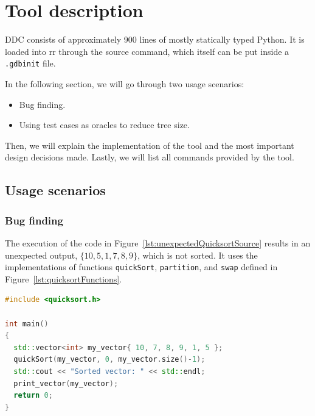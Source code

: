 \chapter{Tool description}
\label{cap:toolDescription}
DDC consists of approximately 900 lines of mostly statically typed Python.
%
It is loaded into rr through the source command, which itself can be put inside a \verb|.gdbinit| file.

In the following section, we will go through two usage scenarios:
\begin{itemize}
    \item Bug finding.
    \item Using test cases as oracles to reduce tree size.
\end{itemize}

Then, we will explain the implementation of the tool and the most important design decisions made. 
%
Lastly, we will list all commands provided by the tool.

\section{Usage scenarios}


\subsection{Bug finding}
The execution of the code in Figure~\ref{lst:unexpectedQuicksortSource} results in an unexpected output, \(\{10, 5, 1, 7, 8, 9\}\), which is not sorted.
It uses the implementations of functions \verb|quickSort|, \verb|partition|, and \verb|swap| defined in Figure~\ref{lst:quicksortFunctions}.
\begin{lstlisting}[language=C++, caption={Code that results in unexpected output}, frame=tb, label={lst:unexpectedQuicksortSource}]
#include <quicksort.h>

int main()
{
  std::vector<int> my_vector{ 10, 7, 8, 9, 1, 5 };
  quickSort(my_vector, 0, my_vector.size()-1);
  std::cout << "Sorted vector: " << std::endl;
  print_vector(my_vector);
  return 0;
}
\end{lstlisting}

